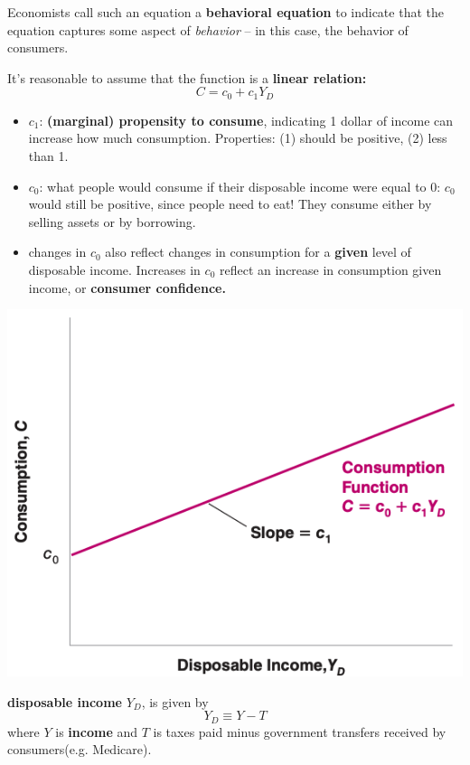 \documentclass[11pt, a4paper]{ECON2123}
\begin{document}
\begin{spacing}{1.5}
    Economists call such an equation a {\bf behavioral equation} 
    to indicate that the equation captures some aspect of 
    {\it behavior} -- in this case, the behavior of consumers.

    It's reasonable to assume that the function is a {\bf linear relation:}
    $$C=c_0+c_1Y_D$$
    \begin{itemize}
        \item $c_1$: {\bf (marginal) propensity to consume}, indicating 
        1 dollar of income can increase how much consumption. 
        Properties: (1) should be positive, (2) less than 1.
        \item $c_0$: what people would consume if their disposable 
        income were equal to 0: $c_0$ would still be positive, since 
        people need to eat! They consume either by selling assets or 
        by borrowing.
        \item changes in $c_0$ also reflect changes in consumption for 
        a {\bf given} level of disposable income. Increases in $c_0$ reflect
        an increase in consumption given income, or {\bf consumer confidence.}
    \end{itemize}

    \begin{center}
        \includegraphics[scale=0.4]{images/03-c-yd.png}
    \end{center}

    {\bf disposable income }$Y_D$, is given by 
    $$Y_D\equiv Y-T$$
    where $Y$ is {\bf income } and $T$ is taxes paid minus government 
    transfers received by consumers(e.g. Medicare).


\end{spacing}
\end{document}
